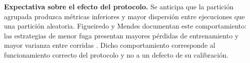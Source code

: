 
\noindent\textbf{Expectativa sobre el efecto del protocolo.} Se anticipa
que la partición agrupada produzca métricas inferiores y mayor dispersión
entre ejecuciones que una partición aleatoria. Figueiredo y Mendes
documentan este comportamiento: las estrategias de menor fuga presentan
mayores pérdidas de entrenamiento y mayor varianza entre corridas
\cite{figueiredo_leakage_2024}. Dicho comportamiento corresponde al
funcionamiento correcto del protocolo y no a un defecto de su
calibración.

